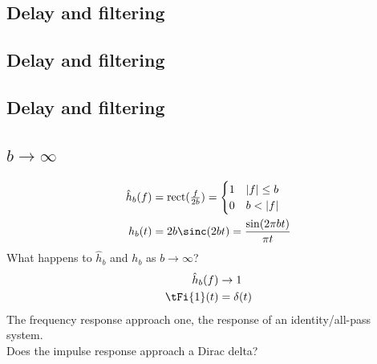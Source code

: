 \documentclass{ximera}
\begin{document}
\subsection{Delay and filtering}




\subsection{Delay and filtering}




\subsection{Delay and filtering}




\subsection{$b \to \infty$}
    \begin{align*}
      \hat{h}_b(f)
      &= \operatorname{rect}(\tfrac{f}{2b})
      = \begin{cases}
      1 & |f| \leq b\\
      0 & b < |f|
    \end{cases}\\
      h_b(t)
      &= 2 b \sinc(2 b t) = \frac{\sin(2 \pi b t)}{\pi t}
    \end{align*}
What happens to $\hat{h}_b$ and $h_b$ as $b \to \infty$?
\begin{align*}
  \hat{h}_b(f) &\to 1\\
  \tFi{1}(t) &=\delta(t)\\
\end{align*}
The frequency response approach one, the response of an identity/all-pass system.\\
Does the impulse response approach a Dirac delta?
\end{document}
